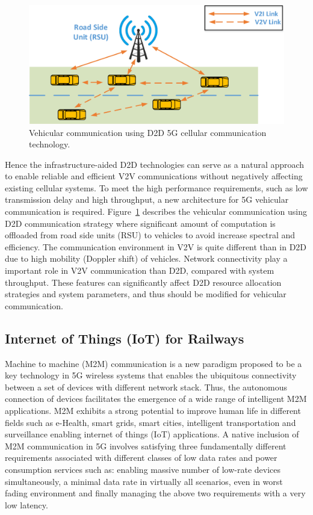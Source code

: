 \begin{figure}[!ht]
	\centering
\includegraphics[width=\textwidth,keepaspectratio]{images/Gill/5G/vehiclecomm.eps}
	\caption{Vehicular communication using D2D 5G cellular communication technology.}
	\label{vcomm}
\end{figure}

Hence the infrastructure-aided D2D technologies can serve as a natural approach to enable reliable and efficient V2V communications without negatively affecting existing cellular systems. To meet the high performance requirements, such as low transmission delay and high throughput, a new architecture for 5G vehicular communication is required. Figure~\ref{vcomm} describes the vehicular communication  using D2D communication strategy where significant amount of computation is offloaded from road side units (RSU) to vehicles to avoid increase spectral and efficiency. The communication environment in V2V is quite different than in D2D due to high mobility (Doppler shift) of vehicles. Network connectivity play a important role in V2V communication than D2D, compared with system throughput. These features can significantly affect D2D resource allocation strategies and system parameters, and thus should be modified for vehicular communication.

\subsection{Internet of Things (IoT) for Railways}

Machine to machine (M2M) communication is a new paradigm proposed to be a key technology in 5G wireless systems that enables the ubiquitous connectivity  between a set  of devices  with different network stack.  Thus,  the  autonomous  connection  of  devices  facilitates  the  emergence  of  a  wide  range  of  intelligent M2M applications. M2M exhibits a strong potential to improve human life in different fields such as e-Health, smart  grids, smart cities, intelligent transportation and surveillance enabling internet of things (IoT) applications. A native inclusion of M2M communication in 5G involves satisfying three fundamentally different requirements associated with different classes of low data rates and power consumption services such as: enabling massive number of low-rate devices simultaneously, a minimal data rate in virtually all scenarios, even in worst fading environment and finally managing the above two requirements with a very low latency.



